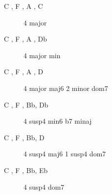 \documentclass[11pt]{article}
\newcommand{\blu}{\color{mblu}}
\newcommand{\note}[1]{{\blu \textsf{#1}}}
\theoremstyle{definition}
\begin{document}
\begin{description}
        \item[\note{C }, \note{F }, \note{A }, \note{C }]   4 major 
        \item[\note{C }, \note{F }, \note{A }, \note{Db}]   4 major min 
        \item[\note{C }, \note{F }, \note{A }, \note{D }]   4 major maj6    2 minor dom7
        \item[\note{C }, \note{F }, \note{Bb}, \note{Db}]   4 susp4 min6   b7 minaj
        \item[\note{C }, \note{F }, \note{Bb}, \note{D }]   4 susp4 maj6    1 susp4 dom7
        \item[\note{C }, \note{F }, \note{Bb}, \note{Eb}]   4 susp4 dom7    
      \end{description}
\end{document}
